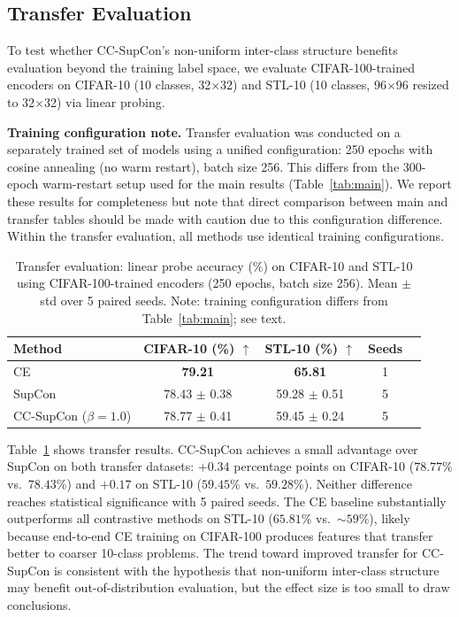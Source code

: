 \documentclass{article}
\begin{document}
\subsection{Transfer Evaluation}
\label{sec:transfer}

To test whether CC-SupCon's non-uniform inter-class structure benefits evaluation beyond the training label space, we evaluate CIFAR-100-trained encoders on CIFAR-10 (10 classes, 32$\times$32) and STL-10 (10 classes, 96$\times$96 resized to 32$\times$32) via linear probing.

\textbf{Training configuration note.} Transfer evaluation was conducted on a separately trained set of models using a unified configuration: 250 epochs with cosine annealing (no warm restart), batch size 256. This differs from the 300-epoch warm-restart setup used for the main results (Table~\ref{tab:main}). We report these results for completeness but note that direct comparison between main and transfer tables should be made with caution due to this configuration difference. Within the transfer evaluation, all methods use identical training configurations.

\begin{table}[t]
\caption{Transfer evaluation: linear probe accuracy (\%) on CIFAR-10 and STL-10 using CIFAR-100-trained encoders (250 epochs, batch size 256). Mean $\pm$ std over 5 paired seeds. Note: training configuration differs from Table~\ref{tab:main}; see text.}
\label{tab:transfer}
\centering
\begin{tabular}{lcccc}
\toprule
Method & CIFAR-10 (\%) $\uparrow$ & STL-10 (\%) $\uparrow$ & Seeds \\
\midrule
CE & \textbf{79.21} & \textbf{65.81} & 1 \\
SupCon & 78.43 $\pm$ 0.38 & 59.28 $\pm$ 0.51 & 5 \\
CC-SupCon ($\beta\!=\!1.0$) & 78.77 $\pm$ 0.41 & 59.45 $\pm$ 0.24 & 5 \\
\bottomrule
\end{tabular}
\end{table}

Table~\ref{tab:transfer} shows transfer results. CC-SupCon achieves a small advantage over SupCon on both transfer datasets: $+0.34$ percentage points on CIFAR-10 ($78.77\%$ vs.\ $78.43\%$) and $+0.17$ on STL-10 ($59.45\%$ vs.\ $59.28\%$). Neither difference reaches statistical significance with 5 paired seeds. The CE baseline substantially outperforms all contrastive methods on STL-10 ($65.81\%$ vs.\ ${\sim}59\%$), likely because end-to-end CE training on CIFAR-100 produces features that transfer better to coarser 10-class problems. The trend toward improved transfer for CC-SupCon is consistent with the hypothesis that non-uniform inter-class structure may benefit out-of-distribution evaluation, but the effect size is too small to draw conclusions.
\end{document}
